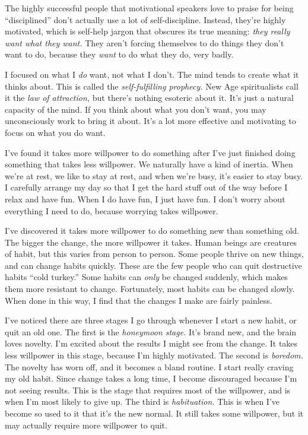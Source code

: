 The highly successful people that motivational speakers love to praise for being ``disciplined'' don't actually use a lot of self-discipline. Instead, they're highly motivated, which is self-help jargon that obscures its true meaning: \emph{they really want what they want.} They aren't forcing themselves to do things they don't want to do, because they \emph{want} to do what they do, very badly.

I focused on what I \emph{do} want, not what I don't. The mind tends to create what it thinks about. This is called the \emph{self-fulfilling prophecy.} New Age spiritualists call it the \emph{law of attraction,} but there's nothing esoteric about it. It's just a natural capacity of the mind. If you think about what you don't want, you may unconsciously work to bring it about. It's a lot more effective and motivating to focus on what you do want.

I've found it takes more willpower to do something after I've just finished doing something that takes less willpower. We naturally have a kind of inertia. When we're at rest, we like to stay at rest, and when we're busy, it's easier to stay busy. I carefully arrange my day so that I get the hard stuff out of the way before I relax and have fun. When I do have fun, I just have fun. I don't worry about everything I need to do, because worrying takes willpower.

I've discovered it takes more willpower to do something new than something old. The bigger the change, the more willpower it takes. Human beings are creatures of habit, but this varies from person to person. Some people thrive on new things, and can change habits quickly. These are the few people who can quit destructive habits ``cold turkey.'' Some habits can \emph{only} be changed suddenly, which makes them more resistant to change. Fortunately, most habits can be changed slowly. When done in this way, I find that the changes I make are fairly painless.

I've noticed there are three stages I go through whenever I start a new habit, or quit an old one. The first is the \emph{honeymoon stage.} It's brand new, and the brain loves novelty. I'm excited about the results I might see from the change. It takes less willpower in this stage, because I'm highly motivated. The second is \emph{boredom.} The novelty has worn off, and it becomes a bland routine. I start really craving my old habit. Since change takes a long time, I become discouraged because I'm not seeing results. This is the stage that requires most of the willpower, and is when I'm most likely to give up. The third is \emph{habituation.} This is when I've become so used to it that it's the new normal. It still takes some willpower, but it may actually require more willpower to quit.

